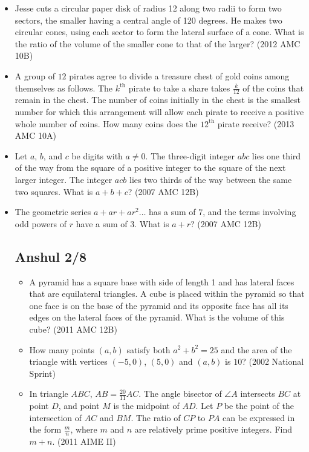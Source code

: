 \documentclass{article}
\begin{document}
\begin{itemize}
\item Jesse cuts a circular paper disk of radius 12 along two radii to form two sectors, the smaller having a central angle of 120 degrees. He makes two circular cones, using each sector to form the lateral surface of a cone. What is the ratio of the volume of the smaller cone to that of the larger? (2012 AMC 10B)

\item A group of $12$ pirates agree to divide a treasure chest of gold coins among themselves as follows.  The $k^{\text{th}}$ pirate to take a share takes $\frac{k}{12}$ of the coins that remain in the chest.  The number of coins initially in the chest is the smallest number for which this arrangement will allow each pirate to receive a positive whole number of coins.  How many coins does the $12^{\text{th}}$ pirate receive? (2013 AMC 10A)



\item Let $a$, $b$, and $c$ be digits with $a\ne 0$. The three-digit integer $abc$ lies one third of the way from the square of a positive integer to the square of the next larger integer. The integer $acb$ lies two thirds of the way between the same two squares. What is $a+b+c$? (2007 AMC 12B)




\item The geometric series $a+ar+ar^2\ldots$ has a sum of $7$, and the terms involving odd powers of $r$ have a sum of $3$. What is $a+r$? (2007 AMC 12B)

\subsection{Anshul 2/8}
\begin{itemize}
\item A pyramid has a square base with side of length 1 and has lateral faces that are equilateral triangles. A cube is placed within the pyramid so that one face is on the base of the pyramid and its opposite face has all its edges on the lateral faces of the pyramid. What is the volume of this cube? (2011 AMC 12B)

\item How many points $(a,b)$ satisfy both $a^2+b^2=25$ and the area of the triangle with vertices $(-5,0)$, $(5,0)$ and $(a,b)$ is $10$? (2002 National Sprint)

\item In triangle $ABC$, $AB=\tfrac{20}{11}AC$. The angle bisector of $\angle A$ intersects $BC$ at point $D$, and point $M$ is the midpoint of $AD$. Let $P$ be the point of the intersection of $AC$ and $BM$. The ratio of $CP$ to $PA$ can be expressed in the form $\tfrac{m}{n}$, where $m$ and $n$ are relatively prime positive integers. Find $m+n$. (2011 AIME II)



\end{itemize}
\end{itemize}
\end{document}
